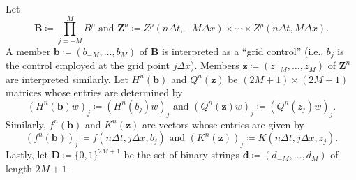\documentclass[12pt]{article}
\begin{document}
Let 
\[
\boldsymbol{B}\coloneqq\prod_{j=-M}^{M}B^{\rho}\text{ and }\boldsymbol{Z}^{n}\coloneqq Z^{\rho}(n\Delta t,-M\Delta x)\times\cdots\times Z^{\rho}(n\Delta t,M\Delta x).
\]
A member $\boldsymbol{b}\coloneqq(b_{-M},\ldots,b_{M})$ of $\boldsymbol{B}$
is interpreted as a ``grid control'' (i.e., $b_{j}$ is the control
employed at the grid point $j\Delta x$). Members $\boldsymbol{z}\coloneqq(z_{-M},\ldots,z_{M})$
of $\boldsymbol{Z}^{n}$ are interpreted similarly. Let $H^{n}(\boldsymbol{b})$
and $Q^{n}(\boldsymbol{z})$ be $(2M+1)\times(2M+1)$ matrices whose
entries are determined by
\[
(H^{n}(\boldsymbol{b})w)_{j}\coloneqq(H^{n}(b_{j})w)_{j}\text{ and }(Q^{n}(\boldsymbol{z})w)_{j}\coloneqq(Q^{n}(z_{j})w)_{j}.
\]
Similarly, $f^{n}(\boldsymbol{b})$ and $K^{n}(\boldsymbol{z})$ are vectors whose
entries are given by
\[
(f^{n}(\boldsymbol{b}))_{j}\coloneqq f(n\Delta t,j\Delta x,b_{j})\text{ and }(K^{n}(\boldsymbol{z}))_{j}\coloneqq K(n\Delta t,j\Delta x,z_{j}).
\]
Lastly, let $\boldsymbol{D}\coloneqq\{0,1\}^{2M+1}$ be the set of
binary strings $\boldsymbol{d}\coloneqq(d_{-M},\ldots,d_{M})$ of
length $2M+1$.
\end{document}
